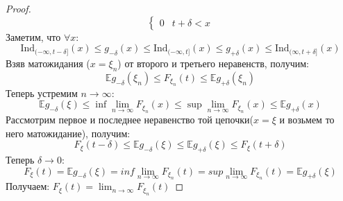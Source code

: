 \begin{proof}
\[\begin{cases}
        0 & t + \delta < x
    \end{cases}
\]
Заметим, что $\forall x$: $$
\text{Ind}_{(- \infty, t - \delta]}\left(x\right) \leq g_{-\delta}\left(x\right) \leq \text{Ind}_{(-\infty, t]}\left(x\right) \leq g_{+\delta}\left(x\right) \leq \text{Ind}_{(\infty, t + \delta]}\left(x\right)$$
Взяв матожидания ($x = \xi_{n}$) от второго и третьего неравенств, получим: $$ \mathbb{E}  g_{-\delta}\left(\xi_{n}\right) \leq F_{\xi_{n}}\left(t\right) \leq  \mathbb{E}  g_{+ \delta}\left(\xi_{n}\right)$$
Теперь устремим $n \to \infty$: 
\[
     \mathbb{E}  g_{-\delta}\left(\xi\right) \leq \inf \lim_{n \to \infty} F_{\xi_{n}}\left(x\right) \leq \sup \lim_{n \to \infty} F_{\xi_{n}}\left(x\right) \leq  \mathbb{E}  g_{+ \delta}\left(x\right)
\]
Рассмотрим первое и последнее неравенство той цепочки($x = \xi$ и возьмем то него матожидание), получим: 
\[
    F_{\xi}\left(t - \delta\right) \leq  \mathbb{E}  g_{- \delta}\left(\xi\right) \leq  \mathbb{E}  g_{+ \delta}\left(\xi\right) \leq F_{\xi}\left(t + \delta\right)
\]
Теперь $\delta \to 0$: 
\[
    F_{\xi}\left(t\right) =  \mathbb{E}  g_{- \delta}\left(\xi\right) = inf \lim_{n \to \infty} F_{\xi_{n}}\left(t\right) = sup \lim_{n \to \infty} F_{\xi_{n}}\left(t\right) =  \mathbb{E}  g_{+ \delta}\left(\xi\right)
\]
Получаем: $F_{\xi}\left(t\right) = \lim_{n \to \infty} F_{\xi_{n}}\left(t\right)$

\end{proof}

